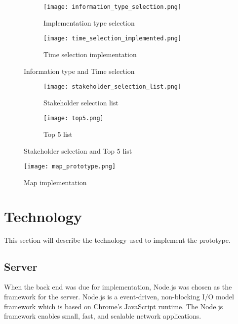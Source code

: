 \begin{figure}[h!tbp]
	\centering
	\begin{subfigure}{0.3\textwidth}
		\texttt{[image: information\_type\_selection.png]}
		\caption[Implementation type selection]{Implementation type selection}
		\label{fig:implementation_type_selection}
	\end{subfigure}
	\begin{subfigure}{0.6\textwidth}
		\texttt{[image: time\_selection\_implemented.png]}
		\caption[Time selection implementation]{Time selection implementation}
		\label{fig:time_selection_implemented}
	\end{subfigure}
	\caption[Information type and Time selection]{Information type and Time selection}
	\label{fig:information_type_and_time_selection}
\end{figure}

\begin{figure}[h!tbp]
	\centering
	\begin{subfigure}{0.4\textwidth}
		\texttt{[image: stakeholder\_selection\_list.png]}
		\caption[Stakeholder selection list]{Stakeholder selection list}
		\label{fig:stakeholder_selection_list}
	\end{subfigure}
	\begin{subfigure}{0.4\textwidth}
		\texttt{[image: top5.png]}
		\caption[Top 5 list]{Top 5 list}
		\label{fig:top_5_list}
	\end{subfigure}
	\caption[Stakeholder selection and Top 5 list]{Stakeholder selection and Top 5 list}
	\label{fig:stakeholder_selection_and_Top5_list}
\end{figure}

\begin{figure}[!htbp]
	\texttt{[image: map\_prototype.png]}
	\caption[Map implementation]{Map implementation}
	\label{fig:map_prototype}
\end{figure}


\section{Technology} %
This section will describe the technology used to implement the prototype.
\label{sec:technology}

\subsection{Server} %
\label{sub:server}
When the back end was due for implementation, Node.js\cite{nodeJs} was chosen 
as the framework for the server. Node.js is a event-driven, non-blocking  I/O
model framework which is based on Chrome's\cite{chromeJavaScriptEngine} 
JavaScript runtime. The Node.js framework enables small, fast, and scalable 
network applications.

